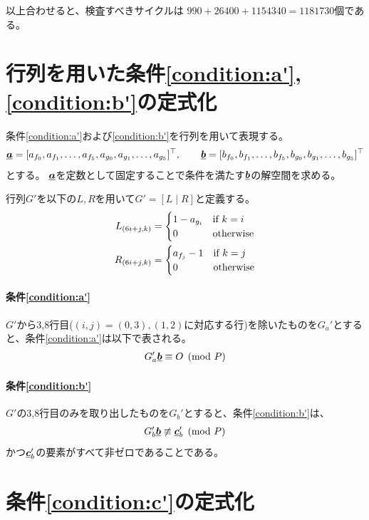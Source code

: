 \documentclass[a4paper,11pt,dvipdfmx]{jsarticle}
\theoremstyle{definition}
\begin{document}
以上合わせると、検査すべきサイクルは
$990+26400+1154340 = 1181730$個である。

\section{行列を用いた条件\ref{condition:a'},\ref{condition:b'}の定式化}\label{sec:14}
条件\ref{condition:a'}および\ref{condition:b'}を行列を用いて表現する。
\begin{align}
  \underline{\bm{a}} = [a_{f_0},a_{f_1},\dots,a_{f_5},a_{g_0},a_{g_1},\dots,a_{g_5}]^\top,\qquad
  \underline{\bm{b}} = [b_{f_0},b_{f_1},\dots,b_{f_5},b_{g_0},b_{g_1},\dots,b_{g_5}]^\top
\end{align}
とする。
$\underline{\bm{a}}$を定数として固定することで条件を満たす$\underline{\bm{b}}$の解空間を求める。

行列$G'$を以下の$L,R$を用いて$G' = [L\mid R]$と定義する。
\begin{align}
  L_{(6i+j, k)} &= \begin{cases}
    1-a_{g_i} & \text{if } k = i\\
    0 & \text{otherwise}
  \end{cases}\\
  R_{(6i+j, k)} &= \begin{cases}
    a_{f_j}-1 & \text{if } k = j\\
    0 & \text{otherwise}
  \end{cases}
\end{align}

\paragraph{条件\ref{condition:a'}}
$G'$から3,8行目($(i,j)=(0,3),(1,2)$に対応する行)を除いたものを$G_a'$とすると、条件\ref{condition:a'}は以下で表される。
\begin{align}
  G_a'\underline{\bm{b}} \equiv O \pmod P
\end{align}

\paragraph{条件\ref{condition:b'}}
$G'$の3,8行目のみを取り出したものを$G_b'$とすると、条件\ref{condition:b'}は、
\begin{align}
  G_b'\underline{\bm{b}} \not\equiv \underline{\bm{c}}_b' \pmod P
\end{align}
かつ$\underline{\bm{c}}_b'$の要素がすべて非ゼロであることである。
\section{条件\ref{condition:c'}の定式化}
\end{document}
